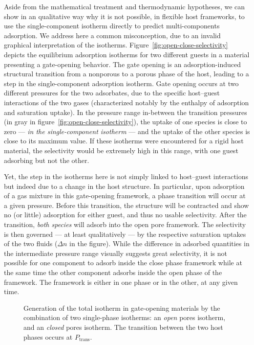 \documentclass[thesis]{subfiles}
\begin{document}
Aside from the mathematical treatment and thermodynamic hypotheses, we can show
in an qualitative way why it is not possible, in flexible host frameworks, to
use the single-component isotherm directly to predict multi-components
adsorption. We address here a common misconception, due to an invalid graphical
interpretation of the isotherms. Figure~\ref{fig:open-close-selectivity} depicts
the equilibrium adsorption isotherms for two different guests in a material
presenting a gate-opening behavior. The gate opening is an adsorption-induced
structural transition from a nonporous to a porous phase of the host, leading to
a step in the single-component adsorption isotherm. Gate opening occurs at two
different pressures for the two adsorbates, due to the specific host--guest
interactions of the two gases (characterized notably by the enthalpy of
adsorption and saturation uptake). In the pressure range in-between the
transition pressures (in gray in figure~\ref{fig:open-close-selectivity}), the
uptake of one species is close to zero --- \emph{in the single-component
isotherm} --- and the uptake of the other species is close to its maximum value.
If these isotherms were encountered for a rigid host material, the selectivity
would be extremely high in this range, with one guest adsorbing but not the
other.

Yet, the step in the isotherms here is not simply linked to host--guest
interactions but indeed due to a change in the host structure. In particular,
upon adsorption of a gas mixture in this gate-opening framework, a phase
transition will occur at a given pressure. Before this transition, the structure
will be contracted and show no (or little) adsorption for either guest, and thus
no usable selectivity. After the transition, \emph{both species} will adsorb
into the open pore framework. The selectivity is then governed --- at least
qualitatively --- by the respective saturation uptakes of the two fluids
($\Delta n$ in the figure). While the difference in adsorbed quantities in the
intermediate pressure range visually suggests great selectivity, it is not
possible for one component to adsorb inside the close phase framework while at
the same time the other component adsorbs inside the open phase of the framework.
The framework is either in one phase or in the other, at any given time.

\begin{figure}[htp]
    \centering
    
    \caption{Generation of the total isotherm in gate-opening materials by the
    combination of two single-phase isotherms: an \emph{open} pores isotherm,
    and an \emph{closed} pores isotherm. The transition between the two host
    phases occurs at $P_\text{trans}$.}
    \label{fig:open-close-isotherms}
\end{figure}
\end{document}
